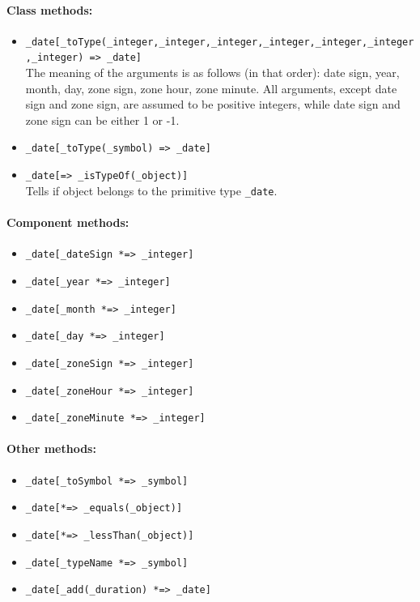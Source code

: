 \documentclass[11pt]{article}
\begin{document}
\paragraph{Class methods:}
\begin{itemize}
    \item {\tt \_date[\_toType(\_integer,\_integer,\_integer,\_integer,\_integer,\_integer,\_integer) => \_date]}
      \\
      The meaning of the arguments is as follows (in that order): date sign, year, month, day, zone sign, zone hour, zone minute.
    All arguments, except date sign and zone sign, are assumed to be
    positive integers, while date sign and zone sign can be either 1 or
    -1. 
    \item {\tt \_date[\_toType(\_symbol) => \_date]}
    \item {\tt \_date[=> \_isTypeOf(\_object)]}\\
      Tells if object belongs to the primitive type {\tt \_date}. 
\end{itemize}

\paragraph{Component methods:}
\begin{itemize}
\item {\tt \_date[\_dateSign *=> \_integer]}   
\item {\tt \_date[\_year *=> \_integer]}   
\item {\tt \_date[\_month *=> \_integer]}  
\item {\tt \_date[\_day *=> \_integer]}   
\item {\tt \_date[\_zoneSign *=> \_integer]}   
\item {\tt \_date[\_zoneHour *=> \_integer]}  
\item {\tt \_date[\_zoneMinute *=> \_integer]}    
\end{itemize}

\paragraph{Other methods:}
\begin{itemize}
\item {\tt \_date[\_toSymbol *=> \_symbol]}   
\item {\tt \_date[*=> \_equals(\_object)]}   
\item {\tt \_date[*=> \_lessThan(\_object)]}   
\item {\tt \_date[\_typeName *=> \_symbol]}   
\item {\tt \_date[\_add(\_duration) *=> \_date]}   
\end{itemize}
\end{document}
